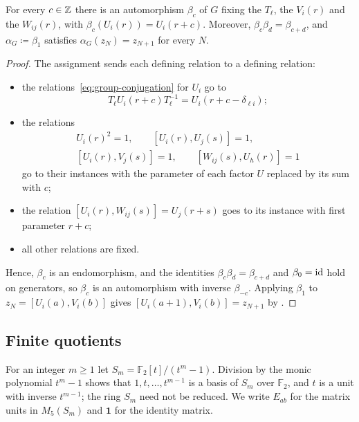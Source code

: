 \begin{proposition}
  \label{prop:shift-automorphism}
  For every ${c\in\mathbb{Z}}$ there is an automorphism $\beta_c$ of $G$ fixing the
  $T_\ell$, the $V_i(r)$ and the $W_{ij}(r)$, with ${\beta_c(U_i(r))=U_i(r+c)}$.
  Moreover, ${\beta_c\beta_d=\beta_{c+d}}$, and ${\alpha_G\coloneqq\beta_1}$
  satisfies ${\alpha_G(z_N)=z_{N+1}}$ for every $N$.
\end{proposition}

\begin{proof}
  The assignment sends each defining relation to a defining relation:
  \begin{itemize}
    \item the relations~\eqref{eq:group-conjugation} for $U_i$ go to
      \[
        T_\ell U_i(r+c)T_\ell^{-1}=U_i(r+c-\delta_{\ell i});
      \]
    \item the relations
      \begin{gather*}
        U_i(r)^2=1,\qquad[U_i(r),U_j(s)]=1,\\
        [U_i(r),V_j(s)]=1,\qquad[W_{ij}(s),U_h(r)]=1
      \end{gather*}
      go to their instances with the parameter of each factor $U$ replaced by
      its sum with $c$;
    \item the relation ${[U_i(r),W_{ij}(s)]=U_j(r+s)}$ goes to its instance with
      first parameter ${r+c}$;
    \item all other relations are fixed.
  \end{itemize}
  Hence,
  $\beta_c$ is an endomorphism, and the identities ${\beta_c\beta_d=\beta_{c+d}}$
  and ${\beta_0=\id}$ hold on generators, so $\beta_c$ is an automorphism with
  inverse $\beta_{-c}$. Applying $\beta_1$ to ${z_N=[U_i(a),V_i(b)]}$ gives
  ${[U_i(a+1),V_i(b)]=z_{N+1}}$ by .
\end{proof}

\subsection{Finite quotients}
\label{subsec:finite-quotients}

For an integer ${m\geq1}$ let ${S_m=\mathbb{F}_2[t]/(t^m-1)}$. Division by the
monic polynomial ${t^m-1}$ shows that $1,t,\dots,t^{m-1}$ is a basis of $S_m$
over $\mathbb{F}_2$, and $t$ is a unit with inverse $t^{m-1}$; the ring $S_m$
need not be reduced. We write $E_{ab}$ for the matrix units in $M_5(S_m)$ and
$\mathbf{1}$ for the identity matrix.

